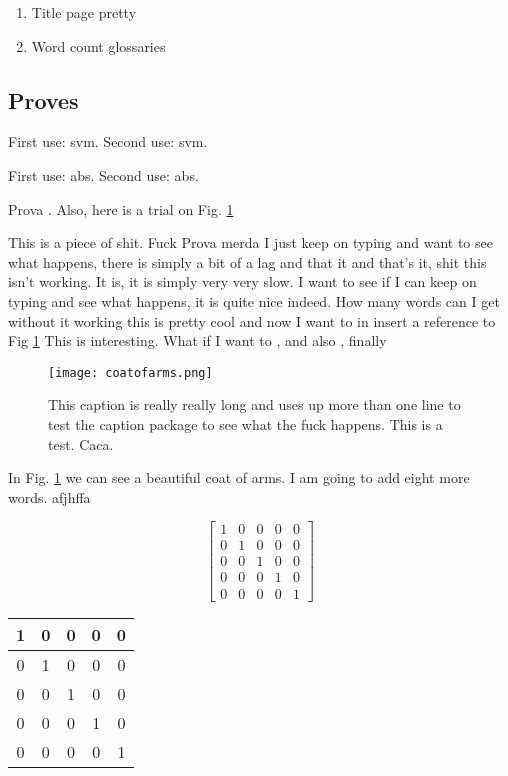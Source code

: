 
\begin{enumerate}

\item Title page pretty

\item Word count glossaries

\end{enumerate}


\subsection{Proves}

First use: \gls{svm}. Second use: \gls{svm}.

First use: \gls{abs}. Second use: \gls{abs}.

Prova \cite{mike}. Also, here is a trial on Fig. \ref{caca}


This is a piece of shit. Fuck Prova merda I just keep on typing and want to see what happens, there is simply a bit of a lag and that it and that's it, shit this isn't working. It is, it is simply very very slow. I want to see if I can keep on typing and see what happens, it is quite nice indeed. How many words can I get without it working this is pretty cool and now I want to in insert a reference to Fig \ref{caca} This is interesting. What if I want to \cite{mike}, and also \cite{Higgs1964}, finally \cite{Nelder1965}

\begin{figure}[htbp]
\begin{center}
\texttt{[image: coatofarms.png]}
\caption{This caption is really really long and uses up more than one line to test the caption package to see what the fuck happens. This is a test. Caca.}
\label{caca}
\end{center}
\end{figure}


In Fig. \ref{caca} we can see a beautiful coat of arms. I am going to add eight more words. afjhffa

\begin{equation}
\label{equ:prova}
\left[\begin{array}{ccccc}1 & 0 & 0 & 0 & 0 \\0 & 1 & 0 & 0 & 0 \\0 & 0 & 1 & 0 & 0 \\0 & 0 & 0 & 1 & 0 \\0 & 0 & 0 & 0 & 1\end{array}\right]
\end{equation}

\begin{centering}
\begin{tabular}{|c|c|c|c|c|}\hline 1 & 0 & 0 & 0 & 0 \\\hline 0 & 1 & 0 & 0 & 0 \\\hline 0 & 0 & 1 & 0 & 0 \\\hline 0 & 0 & 0 & 1 & 0 \\\hline 0 & 0 & 0 & 0 & 1 \\\hline \end{tabular}
\end{centering}



